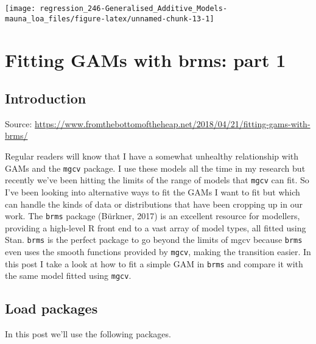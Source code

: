 \documentclass[]{book}
\begin{document}
\begin{center}\texttt{[image: regression\_246-Generalised\_Additive\_Models-mauna\_loa\_files/figure-latex/unnamed-chunk-13-1]} \end{center}

\hypertarget{fitting-gams-with-brms-part-1}{%
\chapter{Fitting GAMs with brms: part 1}\label{fitting-gams-with-brms-part-1}}

\hypertarget{introduction-1}{%
\section{Introduction}\label{introduction-1}}

Source: \url{https://www.fromthebottomoftheheap.net/2018/04/21/fitting-gams-with-brms/}

Regular readers will know that I have a somewhat unhealthy relationship with GAMs and the \texttt{mgcv} package. I use these models all the time in my research but recently we've been hitting the limits of the range of models that \texttt{mgcv} can fit. So I've been looking into alternative ways to fit the GAMs I want to fit but which can handle the kinds of data or distributions that have been cropping up in our work. The \texttt{brms} package (Bürkner, 2017) is an excellent resource for modellers, providing a high-level R front end to a vast array of model types, all fitted using Stan. \texttt{brms} is the perfect package to go beyond the limits of mgcv because \texttt{brms} even uses the smooth functions provided by \texttt{mgcv}, making the transition easier. In this post I take a look at how to fit a simple GAM in \texttt{brms} and compare it with the same model fitted using \texttt{mgcv}.

\hypertarget{load-packages}{%
\section{Load packages}\label{load-packages}}

In this post we'll use the following packages.
\end{document}
